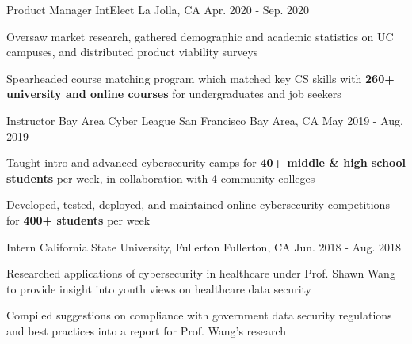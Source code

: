 

\begin{cventries}

  \cventry
    {Product Manager} %
    {IntElect} %
    {La Jolla, CA} %
    {Apr. 2020 - Sep. 2020} %
    {
      \begin{cvitems} %
        \item {Oversaw market research, gathered demographic and academic statistics on UC campuses, and distributed product viability surveys}
        \item {Spearheaded course matching program which matched key CS skills with \textbf{260+ university and online courses} for undergraduates and job seekers}
      \end{cvitems}
    }

  \cventry
    {Instructor} %
    {Bay Area Cyber League} %
    {San Francisco Bay Area, CA} %
    {May 2019 - Aug. 2019} %
    {
      \begin{cvitems} %
        \item {Taught intro and advanced cybersecurity camps for \textbf{40+ middle \& high school students} per week, in collaboration with 4 community colleges}
        \item {Developed, tested, deployed, and maintained online cybersecurity competitions for \textbf{400+ students} per week}
      \end{cvitems}
    }

  \cventry
    {Intern} %
    {California State University, Fullerton} %
    {Fullerton, CA} %
    {Jun. 2018 - Aug. 2018} %
    {
      \begin{cvitems} %
        \item {Researched applications of cybersecurity in healthcare under Prof. Shawn Wang to provide insight into youth views on healthcare data security}
        \item {Compiled suggestions on compliance with government data security regulations and best practices into a report for Prof. Wang's research}
      \end{cvitems}
    }

\end{cventries}
